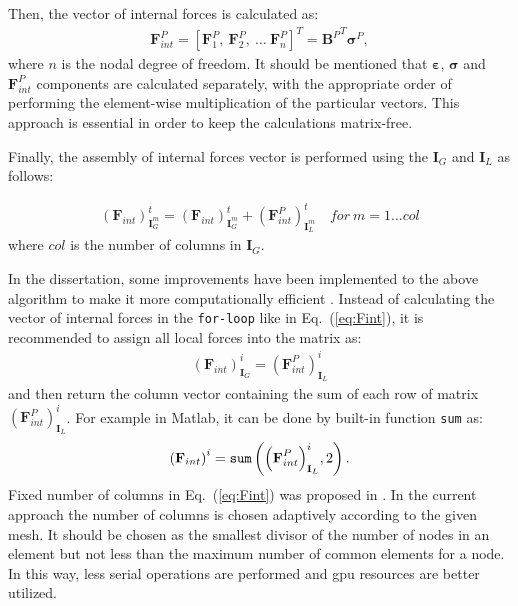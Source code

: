 Then, the vector of internal forces is calculated as:
\begin{eqnarray}
	\label{eq:forces}
	\textbf{F}^P_{int}=\left[\textbf{F}^P_1,\ \textbf{F}^P_2,\ \ldots\ \textbf{F}^P_{n} \right]^T={\textbf{B}^P}^T\boldsymbol{\sigma}^P,
\end{eqnarray}
where $n$ is the nodal degree of freedom.
It should be mentioned that \(\boldsymbol{\varepsilon}\), \(\boldsymbol{\sigma}\) and \(\textbf{F}^P_{int}\) components are calculated separately, with the appropriate order of performing the element-wise multiplication of the particular vectors.
This approach is essential in order to keep the calculations matrix-free.

Finally, the assembly of internal forces vector is performed using the \(\textbf{I}_G\) and \(\textbf{I}_L\) as follows:

\begin{eqnarray}
	\label{eq:Fint}
	{\left(\textbf{F}_{int}\right)}^t_{\textbf{I}^m_G} = {\left(\textbf{F}_{int}\right)}^t_{\textbf{I}^m_G} + {\left(\textbf{F}^P_{int}\right)}^t_{\textbf{I}^m_L}\quad for\ m=1\ldots col 
\end{eqnarray}
where \(col\) is the number of columns in \(\textbf{I}_G\).

In the dissertation, some improvements have been implemented to the above algorithm to make it more computationally efficient \cite{fiborek2022spectral}.
Instead of calculating the vector of internal forces in the \verb+for-loop+ like in Eq.~(\ref{eq:Fint}), it is recommended to assign all local forces into the matrix as:
\begin{eqnarray}
	\label{eq:Fmatrix}
	{\left(\textbf{F}_{int}\right)}^i_{\textbf{I}_G} ={\left(\textbf{F}^P_{int}\right)}^i_{\textbf{I}_L}
\end{eqnarray}
and then return the column vector containing the sum of each row of matrix \({\left(\textbf{F}^P_{int}\right)}^i_{\textbf{I}_L}\).
For example in Matlab, it can be done by built-in function \verb|sum| as:
\begin{eqnarray}
	\label{eq:Fsum}
	{\left(\textbf{F}_{int}\right)}^i = \verb|sum| \left({\left(\textbf{F}^P_{int}\right)}^i_{\textbf{I}_L},2\right).
\end{eqnarray}
Fixed number of columns in Eq.~(\ref{eq:Fint}) was proposed in \cite{kudela2016parallel}.
In the current approach the number of columns is chosen adaptively according to the given mesh.
It should be chosen as the smallest divisor of the number of nodes in an element but not less than the maximum number of common elements for a node.
In this way, less serial operations are performed and \ac{gpu} resources are better utilized.

